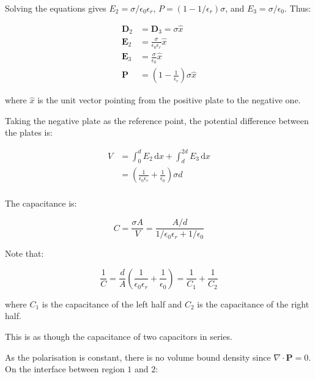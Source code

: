 \documentclass[12pt]{article}
\begin{document}
Solving the equations gives $E_{2} = \sigma/\epsilon_{0} \epsilon_{r}$, $P = (1 - 1/\epsilon_{r}) \sigma$, and $E_{3} = \sigma/\epsilon_{0}$. Thus:

\begin{equation}
    \begin{split}
        \mathbf{D}_{2} &= \mathbf{D}_{3} = \sigma \hat{x} \\
        \mathbf{E}_{2} &= \frac{\sigma}{\epsilon_{0} \epsilon_{r}} \hat{x} \\
        \mathbf{E}_{3} &= \frac{\sigma}{\epsilon_{0}} \hat{x} \\
        \mathbf{P} &= \left( 1 - \frac{1}{\epsilon_{r}} \right) \sigma \hat{x}
    \end{split}
\end{equation}

where $\hat{x}$ is the unit vector pointing from the positive plate to the negative one.

Taking the negative plate as the reference point, the potential difference between the plates is:

\begin{equation}
    \begin{split}
        V &= \int_{0}^{d} E_{2} \, \mathrm{d}x + \int_{d}^{2d} E_{3} \, \mathrm{d}x \\
        &= \left( \frac{1}{\epsilon_{0} \epsilon_{r}} + \frac{1}{\epsilon_{0}} \right) \sigma d \\
    \end{split}
\end{equation}

The capacitance is:

\begin{equation}
    C = \frac{\sigma A}{V} = \frac{A/d}{1/\epsilon_{0} \epsilon_{r} + 1/\epsilon_{0}}
\end{equation}

Note that:

\begin{equation}
    \frac{1}{C} = \frac{d}{A} \left( \frac{1}{\epsilon_{0} \epsilon_{r}} + \frac{1}{\epsilon_{0}} \right) = \frac{1}{C_{1}} + \frac{1}{C_{2}}
\end{equation}

where $C_{1}$ is the capacitance of the left half and $C_{2}$ is the capacitance of the right half.

This is as though the capacitance of two capacitors in series.

As the polarisation is constant, there is no volume bound density since $\nabla \cdot \mathbf{P} = 0$. On the interface between region $1$ and $2$:
\end{document}
